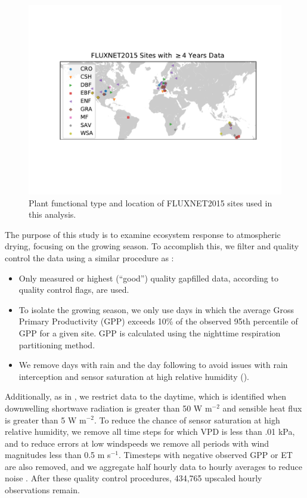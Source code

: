 \documentclass[draft,linenumbers]{afmjournal}
\begin{document}
\begin{figure}
  \centering \includegraphics[width=\textwidth]{./map.pdf}
  \caption{Plant functional type and location of FLUXNET2015 sites
    used in this analysis.}
  \label{map_fig}
\end{figure}

The purpose of this study is to examine ecosystem response to
atmospheric drying, focusing on the growing season. To accomplish
this, we filter and quality control the data using a similar procedure
as \cite{Zhou_2015}:
\begin{itemize}
\item Only measured or highest (``good'') quality gapfilled data,
  according to quality control flags, are used.
\item To isolate the growing season, we only use days in which the
  average Gross Primary Productivity (GPP) exceeds 10\% of the
  observed 95th percentile of GPP for a given site. GPP is calculated
  using the nighttime respiration partitioning method.
\item We remove days with rain and the day following to avoid issues
  with rain interception and sensor saturation at high relative
  humidity (\cite{Medlyn_2017}).
\end{itemize}
Additionally, as in \citet{Lin_2018}, we restrict data to the daytime,
which is identified when downwelling shortwave radiation is greater
than 50 W m$^{-2}$ and sensible heat flux is greater than 5 W
m$^{-2}$. To reduce the chance of sensor saturation at high relative
humidity, we remove all time steps for which VPD is less than .01 kPa,
and to reduce errors at low windspeeds we remove all periods with wind
magnitudes less than 0.5 m s$^{-1}$. Timesteps with negative observed
GPP or ET are also removed, and we aggregate half hourly data to
hourly averages to reduce noise \citep{Lin_2018}. After these quality
control procedures, 434,765 upscaled hourly observations remain.
\end{document}
